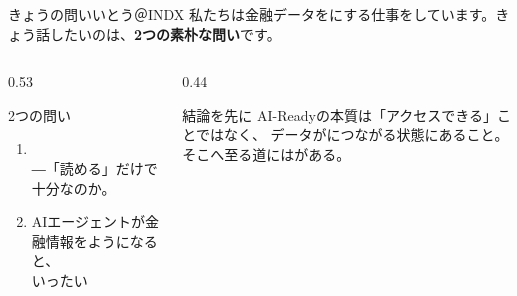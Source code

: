 
\begin{frame}{きょうの問い}{いとう＠INDX}
  {\small 私たちは金融データをにする仕事をしています。きょう話したいのは、\textbf{2つの素朴な問い}です。}
  \vskip3mm
  \begin{columns}[T]
    \begin{column}{0.53\textwidth}
      \begin{keytake}{2つの問い}
        \small
        \begin{enumerate}\setlength\itemsep{2.6mm}
          \item {}\\
            {\small ―「読める」だけで十分なのか。}
          \item AIエージェントが金融情報をようになると、\\
            いったい
        \end{enumerate}
      \end{keytake}
    \end{column}
    \begin{column}{0.44\textwidth}
      \begin{insight}{結論を先に}
        AI-Readyの本質は「アクセスできる」ことではなく、
        データがにつながる状態にあること。\\[2mm]
        そこへ至る道にはがある。
      \end{insight}
    \end{column}
  \end{columns}
\end{frame}

